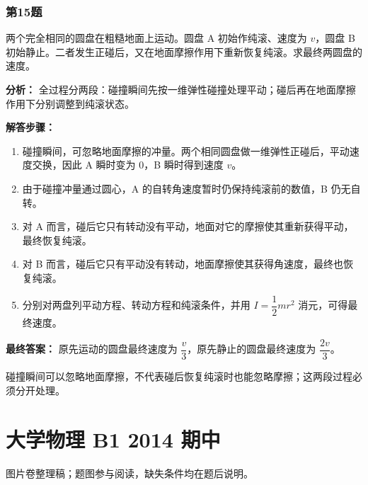 \documentclass[12pt,a4paper]{ctexart}
\begin{document}
\subsubsection*{第15题}
\begin{tcolorbox}[colback=gray!2!white,colframe=black!60,title={题目}]
两个完全相同的圆盘在粗糙地面上运动。圆盘 A 初始作纯滚、速度为 \(v\)，圆盘 B 初始静止。二者发生正碰后，又在地面摩擦作用下重新恢复纯滚。求最终两圆盘的速度。\par
\end{tcolorbox}
\begin{tcolorbox}[colback=blue!2!white,colframe=blue!55!black,title={完整答案}]
\textbf{分析：}
全过程分两段：碰撞瞬间先按一维弹性碰撞处理平动；碰后再在地面摩擦作用下分别调整到纯滚状态。\par
\textbf{解答步骤：}
\begin{enumerate}
\item 碰撞瞬间，可忽略地面摩擦的冲量。两个相同圆盘做一维弹性正碰后，平动速度交换，因此 A 瞬时变为 0，B 瞬时得到速度 \(v\)。
\item 由于碰撞冲量通过圆心，A 的自转角速度暂时仍保持纯滚前的数值，B 仍无自转。
\item 对 A 而言，碰后它只有转动没有平动，地面对它的摩擦使其重新获得平动，最终恢复纯滚。
\item 对 B 而言，碰后它只有平动没有转动，地面摩擦使其获得角速度，最终也恢复纯滚。
\item 分别对两盘列平动方程、转动方程和纯滚条件，并用 \(I=\dfrac12 mr^2\) 消元，可得最终速度。
\end{enumerate}
\textbf{最终答案：}
原先运动的圆盘最终速度为 \(\dfrac{v}{3}\)，原先静止的圆盘最终速度为 \(\dfrac{2v}{3}\)。\par
\end{tcolorbox}
\begin{tcolorbox}[colback=red!2!white,colframe=red!55!black,title={易错点}]
碰撞瞬间可以忽略地面摩擦，不代表碰后恢复纯滚时也能忽略摩擦；这两段过程必须分开处理。\par
\end{tcolorbox}


\section{大学物理 B1 2014 期中}
\begin{tcolorbox}[title=资料说明,colback=yellow!4!white,colframe=orange!60!black]
图片卷整理稿；题图参与阅读，缺失条件均在题后说明。\par
\end{tcolorbox}
\end{document}
